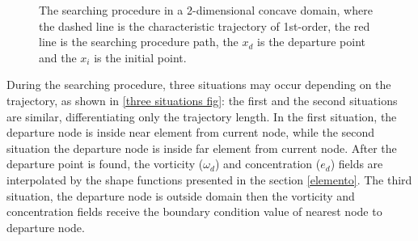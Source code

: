 \begin{figure}[H]
\begin{center}
\end{center}
\caption{
The searching procedure in a 2-dimensional concave domain, 
where the dashed line is the characteristic trajectory of 1st-order,
the red line is the searching procedure path,
the $x_{d}$ is the departure point and
the $x_{i}$ is the initial point.
}
\label{searching procedure fig}
\end{figure}


\medskip
During the searching procedure, three situations may 
occur depending on the trajectory, 
as shown in \ref{three situations fig}: the first and the second 
situations are similar, differentiating only the trajectory length. 
In the first situation, the departure node is inside near 
element from current node, while the second situation 
the departure node is inside far element from current node. 
After the departure point is found, the vorticity ($\omega_{d}$) and 
concentration ($e_{d}$) fields are interpolated by the shape functions
presented in the section \ref{elemento}.
The third situation, the departure node is outside domain 
then the vorticity and concentration fields receive 
the boundary condition value of nearest node to departure node.


